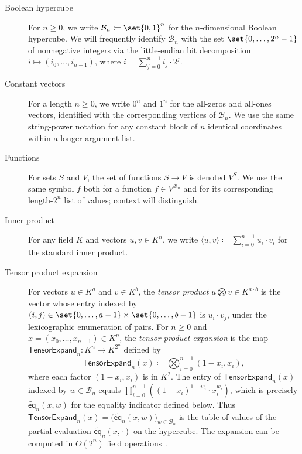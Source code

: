 \documentclass{article}
\theoremstyle{definition}
\newcommand*{\mle}{\widetilde}
\newcommand{\eq}{\mathsf{eq}}
\newcommand{\BB}{\mathcal{B}}
\begin{document}
\begin{description}
\item[Boolean hypercube] For $n \geq 0$, we write $\BB_n \coloneqq \set{0, 1}^n$ for the $n$-dimensional Boolean hypercube. We will frequently identify $\BB_n$ with the set $\set{0, \ldots, 2^n - 1}$ of nonnegative integers via the little-endian bit decomposition $i \mapsto (i_0, \ldots, i_{n - 1})$, where $i = \sum_{j = 0}^{n - 1} i_j \cdot 2^j$.

\item[Constant vectors] For a length $n \geq 0$, we write $0^n$ and $1^n$ for the all-zeros and all-ones vectors, identified with the corresponding vertices of $\BB_n$. We use the same string-power notation for any constant block of $n$ identical coordinates within a longer argument list.

\item[Functions] For sets $S$ and $V$, the set of functions $S \to V$ is denoted $V^S$. We use the same symbol $f$ both for a function $f \in V^{\BB_n}$ and for its corresponding length-$2^n$ list of values; context will distinguish.

\item[Inner product] For any field $K$ and vectors $u, v \in K^n$, we write $\langle u, v \rangle \coloneqq \sum_{i = 0}^{n - 1} u_i \cdot v_i$ for the standard inner product.

\item[Tensor product expansion] For vectors $u \in K^a$ and $v \in K^b$, the \emph{tensor product} $u \bigotimes v \in K^{a \cdot b}$ is the vector whose entry indexed by $(i, j) \in \set{0, \ldots, a - 1} \times \set{0, \ldots, b - 1}$ is $u_i \cdot v_j$, under the lexicographic enumeration of pairs. For $n \geq 0$ and $x = (x_0, \ldots, x_{n - 1}) \in K^n$, the \emph{tensor product expansion} is the map $\textsf{TensorExpand}_n \colon K^n \to K^{2^n}$ defined by
\[
  \textsf{TensorExpand}_n(x) \coloneqq \bigotimes_{i = 0}^{n - 1} (1 - x_i, x_i),
\]
where each factor $(1 - x_i, x_i)$ is in $K^2$. The entry of $\textsf{TensorExpand}_n(x)$ indexed by $w \in \BB_n$ equals $\prod_{i = 0}^{n - 1} \left( (1 - x_i)^{1 - w_i} \cdot x_i^{w_i} \right)$, which is precisely $\mle{\eq}_n(x, w)$ for the equality indicator defined below. Thus $\textsf{TensorExpand}_n(x) = \bigl( \mle{\eq}_n(x, w) \bigr)_{w \in \BB_n}$ is the table of values of the partial evaluation $\mle{\eq}_n(x, \cdot)$ on the hypercube. The expansion can be computed in $O(2^n)$ field operations~\cite[Lem.~3.8]{Thaler:2022aa}.


\end{description}
\end{document}
